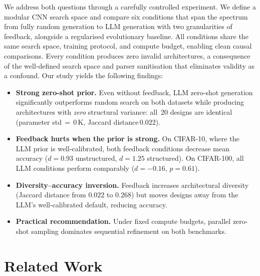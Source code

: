 \documentclass[10pt]{article}
\begin{document}
We address both questions through a carefully controlled experiment.  We define a
modular CNN search space and compare six conditions that span the spectrum from
fully random generation to LLM generation with two granularities of feedback,
alongside a regularised evolutionary baseline.  All conditions share the same
search space, training protocol, and compute budget, enabling clean causal
comparisons.  Every condition produces zero invalid architectures, a consequence
of the well-defined search space and parser sanitisation that eliminates validity
as a confound.  Our study yields the following findings:

\begin{itemize}[nosep,leftmargin=1.2em]
\item \textbf{Strong zero-shot prior.}  Even without feedback, LLM zero-shot
  generation significantly outperforms random search on both datasets while
  producing architectures with \emph{zero} structural variance: all~20 designs
  are identical (parameter std\,${=}\,$0\,K, Jaccard distance\,$0.022$).
\item \textbf{Feedback hurts when the prior is strong.}  On CIFAR-10, where the
  LLM prior is well-calibrated, both feedback conditions decrease mean accuracy
  ($d{=}0.93$ unstructured, $d{=}1.25$ structured).  On CIFAR-100, all LLM
  conditions perform comparably ($d{=}{-}0.16$, $p{=}0.61$).
\item \textbf{Diversity--accuracy inversion.}  Feedback increases architectural
  diversity (Jaccard distance from $0.022$ to $0.268$) but moves designs away
  from the LLM's well-calibrated default, reducing accuracy.
\item \textbf{Practical recommendation.}  Under fixed compute budgets, parallel
  zero-shot sampling dominates sequential refinement on both benchmarks.
\end{itemize}

\section{Related Work}
\label{sec:related}
\end{document}
